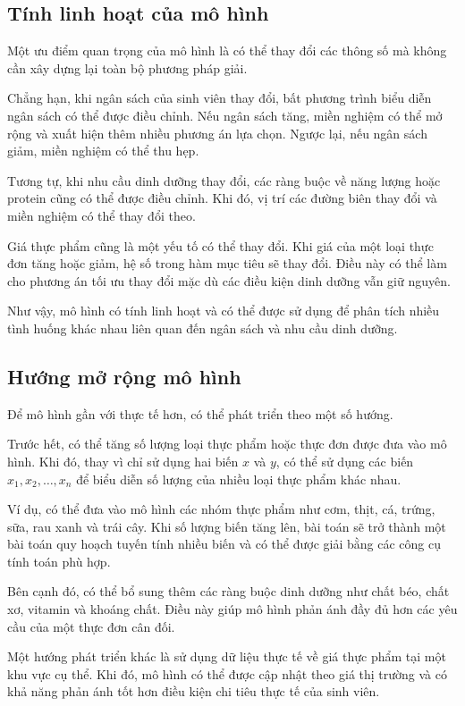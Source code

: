 \documentclass[12pt,a4paper]{article}
\begin{document}
\subsection{Tính linh hoạt của mô hình}

Một ưu điểm quan trọng của mô hình là có thể thay đổi các thông số
mà không cần xây dựng lại toàn bộ phương pháp giải.

Chẳng hạn, khi ngân sách của sinh viên thay đổi, bất phương trình
biểu diễn ngân sách có thể được điều chỉnh. Nếu ngân sách tăng, miền
nghiệm có thể mở rộng và xuất hiện thêm nhiều phương án lựa chọn.
Ngược lại, nếu ngân sách giảm, miền nghiệm có thể thu hẹp.

Tương tự, khi nhu cầu dinh dưỡng thay đổi, các ràng buộc về năng
lượng hoặc protein cũng có thể được điều chỉnh. Khi đó, vị trí các
đường biên thay đổi và miền nghiệm có thể thay đổi theo.

Giá thực phẩm cũng là một yếu tố có thể thay đổi. Khi giá của một loại
thực đơn tăng hoặc giảm, hệ số trong hàm mục tiêu sẽ thay đổi. Điều
này có thể làm cho phương án tối ưu thay đổi mặc dù các điều kiện
dinh dưỡng vẫn giữ nguyên.

Như vậy, mô hình có tính linh hoạt và có thể được sử dụng để phân
tích nhiều tình huống khác nhau liên quan đến ngân sách và nhu cầu
dinh dưỡng.

\subsection{Hướng mở rộng mô hình}

Để mô hình gần với thực tế hơn, có thể phát triển theo một số hướng.

Trước hết, có thể tăng số lượng loại thực phẩm hoặc thực đơn được đưa
vào mô hình. Khi đó, thay vì chỉ sử dụng hai biến $x$ và $y$, có thể
sử dụng các biến $x_1,x_2,\ldots,x_n$ để biểu diễn số lượng của nhiều
loại thực phẩm khác nhau.

Ví dụ, có thể đưa vào mô hình các nhóm thực phẩm như cơm, thịt, cá,
trứng, sữa, rau xanh và trái cây. Khi số lượng biến tăng lên, bài toán
sẽ trở thành một bài toán quy hoạch tuyến tính nhiều biến và có thể
được giải bằng các công cụ tính toán phù hợp.

Bên cạnh đó, có thể bổ sung thêm các ràng buộc dinh dưỡng như chất
béo, chất xơ, vitamin và khoáng chất. Điều này giúp mô hình phản ánh
đầy đủ hơn các yêu cầu của một thực đơn cân đối.

Một hướng phát triển khác là sử dụng dữ liệu thực tế về giá thực phẩm
tại một khu vực cụ thể. Khi đó, mô hình có thể được cập nhật theo giá
thị trường và có khả năng phản ánh tốt hơn điều kiện chi tiêu thực tế
của sinh viên.
\end{document}
